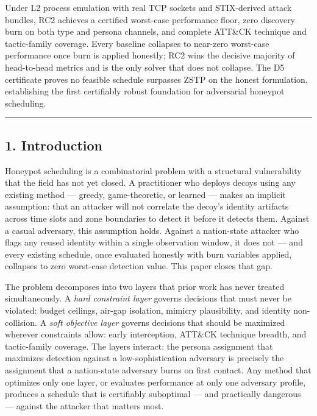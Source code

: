 \documentclass[
  11pt,
]{article}
\begin{document}
Under L2 process emulation with real TCP sockets and STIX-derived attack
bundles, RC2 achieves a certified worst-case performance floor, zero
discovery burn on both type and persona channels, and complete ATT\&CK
technique and tactic-family coverage. Every baseline collapses to
near-zero worst-case performance once burn is applied honestly; RC2 wins
the decisive majority of head-to-head metrics and is the only solver
that does not collapse. The D5 certificate proves no feasible schedule
surpasses ZSTP on the honest formulation, establishing the first
certifiably robust foundation for adversarial honeypot scheduling.

\begin{center}\rule{0.5\linewidth}{0.5pt}\end{center}

\hypertarget{introduction}{%
\subsection{1. Introduction}\label{introduction}}

Honeypot scheduling is a combinatorial problem with a structural
vulnerability that the field has not yet closed. A practitioner who
deploys decoys using any existing method --- greedy, game-theoretic, or
learned --- makes an implicit assumption: that an attacker will not
correlate the decoy's identity artifacts across time slots and zone
boundaries to detect it before it detects them. Against a casual
adversary, this assumption holds. Against a nation-state attacker who
flags any reused identity within a single observation window, it does
not --- and every existing schedule, once evaluated honestly with burn
variables applied, collapses to zero worst-case detection value. This
paper closes that gap.

The problem decomposes into two layers that prior work has never treated
simultaneously. A \emph{hard constraint layer} governs decisions that
must never be violated: budget ceilings, air-gap isolation, mimicry
plausibility, and identity non-collision. A \emph{soft objective layer}
governs decisions that should be maximized wherever constraints allow:
early interception, ATT\&CK technique breadth, and tactic-family
coverage. The layers interact: the persona assignment that maximizes
detection against a low-sophistication adversary is precisely the
assignment that a nation-state adversary burns on first contact. Any
method that optimizes only one layer, or evaluates performance at only
one adversary profile, produces a schedule that is certifiably
suboptimal --- and practically dangerous --- against the attacker that
matters most.
\end{document}
